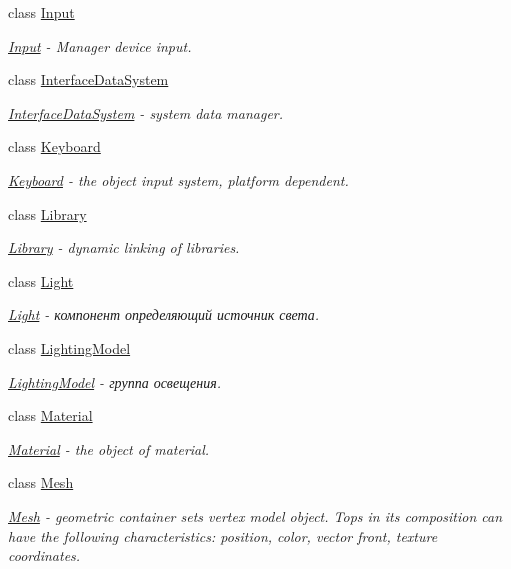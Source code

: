 \begin{DoxyCompactItemize}
class \hyperlink{classcsad_1_1_input}{Input}
\begin{DoxyCompactList}\small\item\em \hyperlink{classcsad_1_1_input}{Input} -\/ Manager device input. \end{DoxyCompactList}\item 
class \hyperlink{classcsad_1_1_interface_data_system}{Interface\-Data\-System}
\begin{DoxyCompactList}\small\item\em \hyperlink{classcsad_1_1_interface_data_system}{Interface\-Data\-System} -\/ system data manager. \end{DoxyCompactList}\item 
class \hyperlink{classcsad_1_1_keyboard}{Keyboard}
\begin{DoxyCompactList}\small\item\em \hyperlink{classcsad_1_1_keyboard}{Keyboard} -\/ the object input system, platform dependent. \end{DoxyCompactList}\item 
class \hyperlink{classcsad_1_1_library}{Library}
\begin{DoxyCompactList}\small\item\em \hyperlink{classcsad_1_1_library}{Library} -\/ dynamic linking of libraries. \end{DoxyCompactList}\item 
class \hyperlink{classcsad_1_1_light}{Light}
\begin{DoxyCompactList}\small\item\em \hyperlink{classcsad_1_1_light}{Light} -\/ компонент определяющий источник света. \end{DoxyCompactList}\item 
class \hyperlink{classcsad_1_1_lighting_model}{Lighting\-Model}
\begin{DoxyCompactList}\small\item\em \hyperlink{classcsad_1_1_lighting_model}{Lighting\-Model} -\/ группа освещения. \end{DoxyCompactList}\item 
class \hyperlink{classcsad_1_1_material}{Material}
\begin{DoxyCompactList}\small\item\em \hyperlink{classcsad_1_1_material}{Material} -\/ the object of material. \end{DoxyCompactList}\item 
class \hyperlink{classcsad_1_1_mesh}{Mesh}
\begin{DoxyCompactList}\small\item\em \hyperlink{classcsad_1_1_mesh}{Mesh} -\/ geometric container sets vertex model object. Tops in its composition can have the following characteristics\-: position, color, vector front, texture coordinates. \end{DoxyCompactList}\item 

\end{DoxyCompactItemize}
